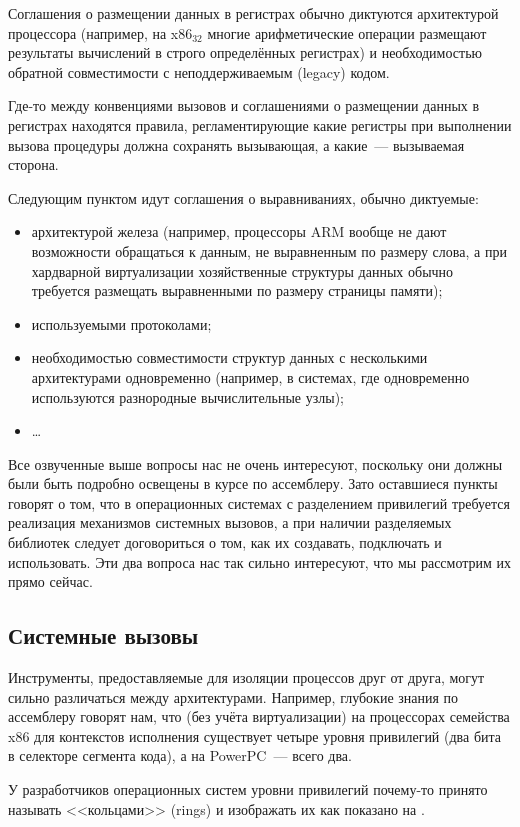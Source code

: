 Соглашения о размещении данных в регистрах обычно диктуются архитектурой процессора (например, на x$86_{32}$ многие арифметические операции размещают результаты вычислений в строго определённых регистрах) и необходимостью обратной совместимости с неподдерживаемым (legacy) кодом.

Где-то между конвенциями вызовов и соглашениями о размещении данных в регистрах находятся правила, регламентирующие какие регистры при выполнении вызова процедуры должна сохранять вызывающая, а какие~--- вызываемая сторона.

Следующим пунктом идут соглашения о выравниваниях, обычно диктуемые:
\begin{itemize}
    \item архитектурой железа (например, процессоры ARM вообще не дают возможности обращаться к данным, не выравненным по размеру слова, а при хардварной виртуализации хозяйственные структуры данных обычно требуется размещать выравненными по размеру страницы памяти);
    \item используемыми протоколами;
    \item необходимостью совместимости структур данных с несколькими архитектурами одновременно (например, в системах, где одновременно используются разнородные вычислительные узлы);
    \item \dots
\end{itemize}

Все озвученные выше вопросы нас не очень интересуют, поскольку они должны были быть подробно освещены в курсе по ассемблеру.
Зато оставшиеся пункты говорят о том, что в операционных системах с разделением привилегий требуется реализация механизмов системных вызовов, а при наличии разделяемых библиотек следует договориться о том, как их создавать, подключать и использовать.
Эти два вопроса нас так сильно интересуют, что мы рассмотрим их прямо сейчас.

\subsection{Системные вызовы}
Инструменты, предоставляемые для изоляции процессов друг от друга, могут сильно различаться между архитектурами.
Например, глубокие знания по ассемблеру говорят нам, что (без учёта виртуализации) на процессорах семейства x86 для контекстов исполнения существует четыре уровня привилегий (два бита в селекторе сегмента кода), а на PowerPC~--- всего два.

У разработчиков операционных систем уровни привилегий почему-то принято называть <<кольцами>> (rings) и изображать их как показано на .

